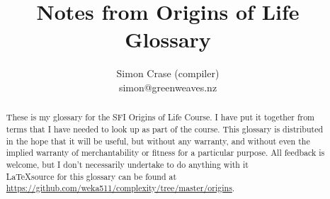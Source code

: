 \documentclass[]{article}
\title{
	Notes from Origins of Life\\
	Glossary
}
\author{Simon Crase (compiler) \\simon@greenweaves.nz}
\begin{document}
	\maketitle

\begin{abstract}
	These is my glossary for the SFI Origins of Life Course. I have put it together from terms that I have needed to look up as part of the course.
	This glossary is distributed in the hope that it will be useful,
	but without any warranty, and without even the implied warranty of
	merchantability or fitness for a particular purpose. All feedback is welcome,
	but I don't necessarily undertake to do anything with it\\
	\LaTeX source for this glossary can be found at\\
	\url{https://github.com/weka511/complexity/tree/master/origins}.
\end{abstract}
	
	\glsaddall
	\printglossaries
	
	
	
	
\end{document}
